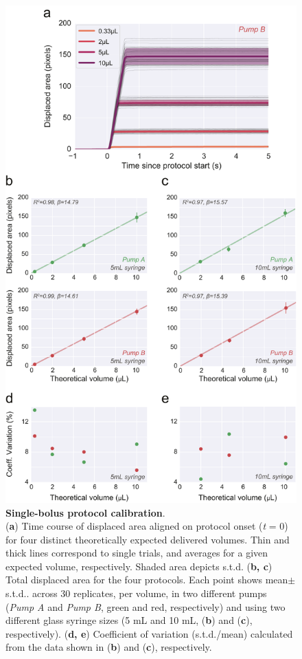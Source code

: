\begin{figure}
	\centering
	\includegraphics[width=0.7\linewidth]{Figures/Artboard 5.pdf}
	\caption{\textbf{Single-bolus protocol calibration}.\\
		(\textbf{a}) Time course of displaced area aligned on protocol onset (\textit{t} = 0) for four distinct theoretically expected delivered volumes. Thin and thick lines correspond to single trials, and averages for a given expected volume, respectively. Shaded area depicts s.t.d. (\textbf{b, c}) Total displaced area for the four protocols. Each point shows mean$\pm$s.t.d.. across 30 replicates, per volume, in two different pumps (\textit{Pump A} and \textit{Pump B}, green and red, respectively) and using two different glass syringe sizes (5 mL and 10 mL, (\textbf{b}) and (\textbf{c}), respectively). (\textbf{d, e}) Coefficient of variation (s.t.d./mean) calculated from the data shown in (\textbf{b}) and (\textbf{c}), respectively.}
	\label{fig:SingleStepCalibration} 
\end{figure}

